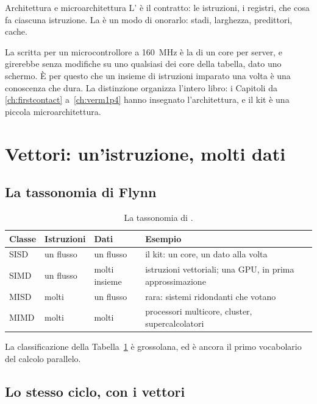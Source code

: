 \begin{definition}{Architettura e microarchitettura}
L' è il contratto: le istruzioni, i registri, che cosa fa
ciascuna istruzione. La  è un modo di onorarlo: stadi,
larghezza, predittori, cache.
\end{definition}

La  scritta per un microcontrollore a 160~MHz è la  di un
core per server, e \vermone girerebbe senza modifiche su uno qualsiasi dei core
della tabella, dato uno schermo. È per questo che un insieme di istruzioni
imparato una volta è una conoscenza che dura. La distinzione organizza l'intero
libro: i Capitoli da \ref{ch:firstcontact} a~\ref{ch:verm1p4} hanno insegnato
l'architettura, e il kit è una piccola microarchitettura.

\section{Vettori: un'istruzione, molti dati}

\subsection{La tassonomia di Flynn}

\begin{table}[htb]
\centering\small
\caption{La tassonomia di \citet{flynn1972}.}\label{tab:by:flynn}
\begin{tabular}{@{}llll@{}}
\toprule
\textbf{Classe} & \textbf{Istruzioni} & \textbf{Dati} & \textbf{Esempio}\\
\midrule
SISD & un flusso & un flusso & il kit: un core, un dato alla volta\\
SIMD & un flusso & molti insieme & istruzioni vettoriali; una GPU, in prima approssimazione\\
MISD & molti & un flusso & rara: sistemi ridondanti che votano\\
MIMD & molti & molti & processori multicore, cluster, supercalcolatori\\
\bottomrule
\end{tabular}
\end{table}

La classificazione della Tabella~\ref{tab:by:flynn} è grossolana, ed è ancora
il primo vocabolario del calcolo parallelo.

\subsection{Lo stesso ciclo, con i vettori}

